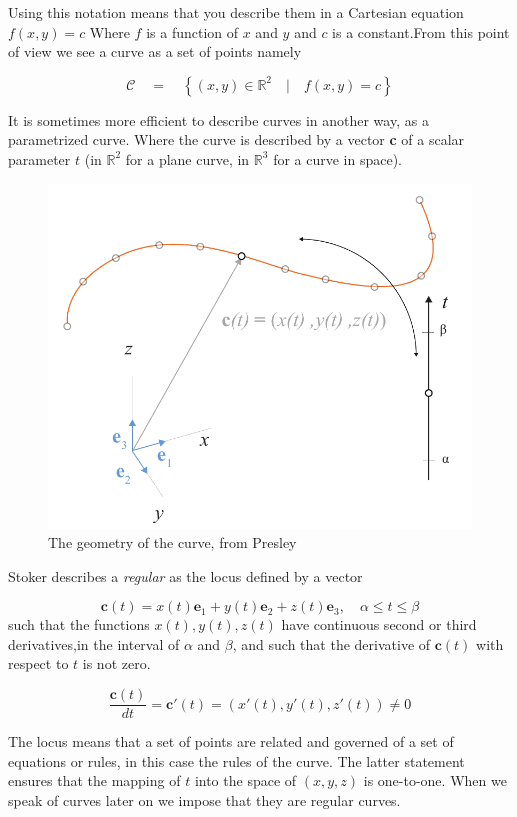 Using this notation means that you describe them in a Cartesian equation $f(x,y) = c$
Where $f$ is a function of $x$ and $y$ and $c$ is a constant.From this point of view we see a curve as a set of points namely

$$ \mathcal{C}\quad =\quad \left\{ (x,y) \in \mathbb{R}^2\quad |\quad f(x,y) = c \right\} $$


It is sometimes more efficient to describe curves in another way, as a parametrized curve. Where the curve is described by a vector \textbf{c} of a scalar parameter $t$ (in $\mathbb{R}^2$ for a plane curve, in $\mathbb{R}^3$ for a curve in space). 



\begin{figure}[H]
\centering
\includegraphics[width=0.7\linewidth ]{figure/Theory/CurveInSpace.pdf}              
\caption{The geometry of the curve, from Presley }
\end{figure}

Stoker describes a \textit{regular} as the locus defined by a vector

\begin{equation}
\textbf{c}(t) = x(t)\textbf{e}_1 +  y(t)\textbf{e}_2+  z(t)\textbf{e}_3,\quad  \alpha \leq t \leq \beta
\end{equation}
 such that the functions  $x(t), y(t), z(t)$ have continuous second or third derivatives,in the interval of $\alpha$ and $\beta$, and such that the derivative of $\textbf{c}(t)$ with respect to $t$ is not zero.
 
 \begin{equation}
 \frac{\textbf{c}(t)}{dt} = \textbf{c}'(t)= (x'(t),y'(t),z'(t)) \neq 0
 \end{equation}

The locus means that a set of points are related and governed of a set of equations or rules, in this case the rules of the curve. The latter statement ensures that the mapping of $t$ into the space of $(x,y,z)$ is one-to-one. When we speak of curves later on we impose that they are regular curves.

